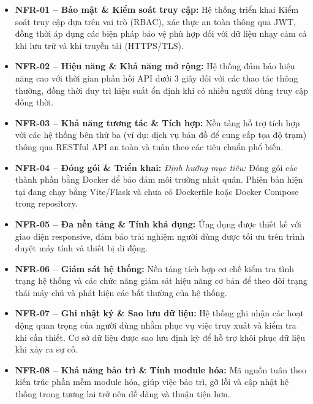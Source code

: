 \begin{itemize}

\item
\textbf{NFR-01 -- Bảo mật \& Kiểm soát truy cập:}
Hệ thống triển khai Kiểm soát truy cập dựa trên vai trò (RBAC), xác thực an toàn thông qua JWT, đồng thời áp dụng các biện pháp bảo vệ phù hợp đối với dữ liệu nhạy cảm cả khi lưu trữ và khi truyền tải (HTTPS/TLS).

\item
\textbf{NFR-02 -- Hiệu năng \& Khả năng mở rộng:}
Hệ thống đảm bảo hiệu năng cao với thời gian phản hồi API dưới 3 giây đối với các thao tác thông thường, đồng thời duy trì hiệu suất ổn định khi có nhiều người dùng truy cập đồng thời.

\item
\textbf{NFR-03 -- Khả năng tương tác \& Tích hợp:}
Nền tảng hỗ trợ tích hợp với các hệ thống bên thứ ba (ví dụ: dịch vụ bản đồ để cung cấp tọa độ trạm) thông qua RESTful API an toàn và tuân theo các tiêu chuẩn phổ biến.

\item
\textbf{NFR-04 -- Đóng gói \& Triển khai:}
\textit{Định hướng mục tiêu:} Đóng gói các thành phần bằng Docker để bảo đảm môi trường nhất quán. Phiên bản hiện tại đang chạy bằng Vite/Flask và chưa có Dockerfile hoặc Docker Compose trong repository.

\item
\textbf{NFR-05 -- Đa nền tảng \& Tính khả dụng:}
Ứng dụng được thiết kế với giao diện responsive, đảm bảo trải nghiệm người dùng được tối ưu trên trình duyệt máy tính và thiết bị di động.

\item
\textbf{NFR-06 -- Giám sát hệ thống:}
Nền tảng tích hợp cơ chế kiểm tra tình trạng hệ thống và các chức năng giám sát hiệu năng cơ bản để theo dõi trạng thái máy chủ và phát hiện các bất thường của hệ thống.

\item
\textbf{NFR-07 -- Ghi nhật ký \& Sao lưu dữ liệu:}
Hệ thống ghi nhận các hoạt động quan trọng của người dùng nhằm phục vụ việc truy xuất và kiểm tra khi cần thiết. Cơ sở dữ liệu được sao lưu định kỳ để hỗ trợ khôi phục dữ liệu khi xảy ra sự cố.

\item
\textbf{NFR-08 -- Khả năng bảo trì \& Tính module hóa:}
Mã nguồn tuân theo kiến trúc phần mềm module hóa, giúp việc bảo trì, gỡ lỗi và cập nhật hệ thống trong tương lai trở nên dễ dàng và thuận tiện hơn.

\end{itemize}
